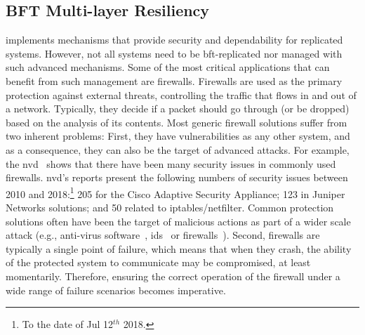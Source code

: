 \subsection{BFT Multi-layer Resiliency} 
\system implements mechanisms that provide security and dependability for replicated systems.
However, not all systems need to be \gls{bft}-replicated nor managed with such advanced mechanisms. 
Some of the most critical applications that can benefit from such management are firewalls.
Firewalls are used as the primary protection against external threats, controlling the traffic that flows in and out of a network. 
Typically, they decide if a packet should go through (or be dropped) based on the analysis of its contents. 
Most generic firewall solutions suffer from two inherent problems: 
First, they have vulnerabilities as any other system, and as a consequence, they can also be the target of advanced attacks. 
For example, the \gls{nvd}~\cite{nvd} shows that there have been many security issues in commonly used firewalls. 
\gls{nvd}'s reports present the following numbers of security issues between 2010 and 2018:\footnote{To the date of Jul 12$^{th}$ 2018.} 205 for the Cisco Adaptive Security Appliance; 123 in Juniper Networks solutions; and 50 related to iptables/netfilter. 
Common protection solutions often have been the target of malicious actions as part of a wider scale attack (e.g., anti-virus software~\cite{Chauhan:2011}, \gls{ids}~\cite{Anderson:2001} or firewalls~\cite{Kamara:2003,Surisetty:2010,cisco1,cisco2}).
Second, firewalls are typically a single point of failure, which means that when they crash, the ability of the protected system to communicate may be compromised, at least momentarily.
Therefore, ensuring the correct operation of the firewall under a wide range of failure scenarios becomes imperative.


